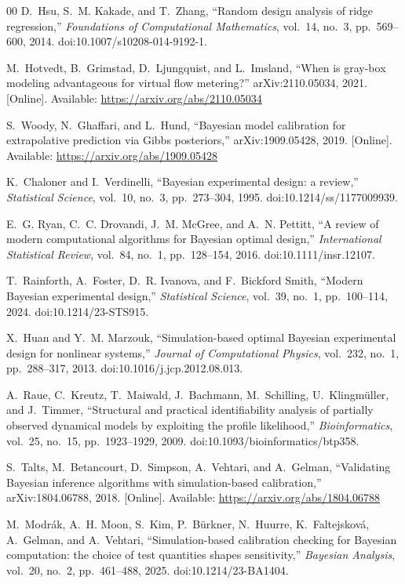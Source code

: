 \begin{thebibliography}{00}
 D.~Hsu, S.~M. Kakade, and T.~Zhang, ``Random design analysis of ridge regression,'' \emph{Foundations of
Computational Mathematics}, vol.~14, no.~3, pp.~569--600, 2014. doi:10.1007/s10208-014-9192-1.

 M.~Hotvedt, B.~Grimstad, D.~Ljungquist, and L.~Imsland, ``When is gray-box modeling advantageous for
virtual flow metering?'' arXiv:2110.05034, 2021. [Online]. Available: \url{https://arxiv.org/abs/2110.05034}

 S.~Woody, N.~Ghaffari, and L.~Hund, ``Bayesian model calibration for extrapolative prediction via Gibbs
posteriors,'' arXiv:1909.05428, 2019. [Online]. Available: \url{https://arxiv.org/abs/1909.05428}

 K.~Chaloner and I.~Verdinelli, ``Bayesian experimental design: a review,'' \emph{Statistical Science},
vol.~10, no.~3, pp.~273--304, 1995. doi:10.1214/ss/1177009939.

 E.~G. Ryan, C.~C. Drovandi, J.~M. McGree, and A.~N. Pettitt, ``A review of modern computational algorithms
for Bayesian optimal design,'' \emph{International Statistical Review}, vol.~84, no.~1, pp.~128--154, 2016.
doi:10.1111/insr.12107.

 T.~Rainforth, A.~Foster, D.~R. Ivanova, and F.~Bickford Smith, ``Modern Bayesian experimental design,''
\emph{Statistical Science}, vol.~39, no.~1, pp.~100--114, 2024. doi:10.1214/23-STS915.

 X.~Huan and Y.~M. Marzouk, ``Simulation-based optimal Bayesian experimental design for nonlinear systems,''
\emph{Journal of Computational Physics}, vol.~232, no.~1, pp.~288--317, 2013. doi:10.1016/j.jcp.2012.08.013.

 A.~Raue, C.~Kreutz, T.~Maiwald, J.~Bachmann, M.~Schilling, U.~Klingm\"uller, and J.~Timmer, ``Structural and
practical identifiability analysis of partially observed dynamical models by exploiting the profile likelihood,''
\emph{Bioinformatics}, vol.~25, no.~15, pp.~1923--1929, 2009. doi:10.1093/bioinformatics/btp358.

 S.~Talts, M.~Betancourt, D.~Simpson, A.~Vehtari, and A.~Gelman, ``Validating Bayesian inference algorithms
with simulation-based calibration,'' arXiv:1804.06788, 2018. [Online]. Available: \url{https://arxiv.org/abs/1804.06788}

 M.~Modr\'ak, A.~H. Moon, S.~Kim, P.~B\"urkner, N.~Huurre, K.~Faltejskov\'a, A.~Gelman, and A.~Vehtari,
``Simulation-based calibration checking for Bayesian computation: the choice of test quantities shapes sensitivity,''
\emph{Bayesian Analysis}, vol.~20, no.~2, pp.~461--488, 2025. doi:10.1214/23-BA1404.


\end{thebibliography}
